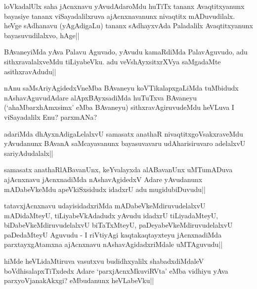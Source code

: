 \begin{artha} 
loVkadalUlx saha jAcnxnavu yAvudAdaroMdu huTiTx tananx Avaqtitxyanunx 
bayasiye tananx viSayadalilxruva ajAcnxnavanunx nivaqtitx 
mADuvudilalx. heVge sAdhanavu (yAgAdigaLu) tananx sAdhayxvAda 
Paladalilx Avaqtitxyanunx bayasuvudilalxvo, hAge||
\end{artha}


\begin{artha} 
BAvaneyiMda yAva Palavu Aguvado, yAvudu kamaRdiMda PalavAguvudo, adu 
sithxravalalxveMdu tiLiyabeVku. adu veVshAyxsitxrXVya saMgadaMte 
asithxravAdudu||
\end{artha}

\begin{artha} 
nAnu saMsAriyAgidedxVneMba BAvaneyu koVTikalapxgaLiMda tuMbidudx 
nAshavAguvudAdare alApxBAyxsadiMda huTuTxva BAvaneyu 
(`ahaMbarxhAmxsimx' eMba BAvaneyu) sithxravAgiruvudeMdu heVLuva I 
viSayadalilx Enu? parxmANa?
\end{artha}

\begin{artha} 
adariMda dhAyxnAdigaLelalxvU samasatx anathaR nivaqtitxgoVsakxraveMdu 
yAvudanunx BAvanA saMcayavanunx bayasuvavaru udAharisiruvaro adelalxvU 
sariyAdudalalx||
\end{artha}

\begin{artha} 
samasatx anathaRlABavanUnx, keYvalayxda alABavanUnx uMTumADuva 
ajAcnxnavu jAcnxnadiMda nAshavAgidedxV Adare yAvudanunx mADabeVkeMdu 
apeVkiSxsidudx idadxrU adu mugidubiDuvudu|| 
\end{artha}


\begin{artha} 
tatavxjAcnxnavu udayisidadxriMda mADabeVkeMdiruvudelalxvU mADidaMteyU, 
tiLiyabeVkAdadudx yAvudu idadxrU tiLiyadaMteyU, 
biDabeVkeMdiruvudelalxvU biTaTxMteyU, paDeyabeVkeMdiruvudelalxvU 
paDedaMteyU Aguvudu - I riVtiyAgi kaqtakaqtayxteyu jAcnxnadiMda 
parxtayxgAtamxna ajAcnxnavu nAshavAgidadxriMdale uMTAguvudu||
\end{artha}


\begin{artha} 
hiMde heVLidaMtiruva vasutxvu budidhxyalilx shabadxdiMdaleV 
boVdhisalapxTiTxdedx Adare `parxjAcnxMkuviRVta' eMba vidhiyu yAva 
parxyoVjanakAkxgi? eMbudanunx heVLabeVku||
\end{artha}

